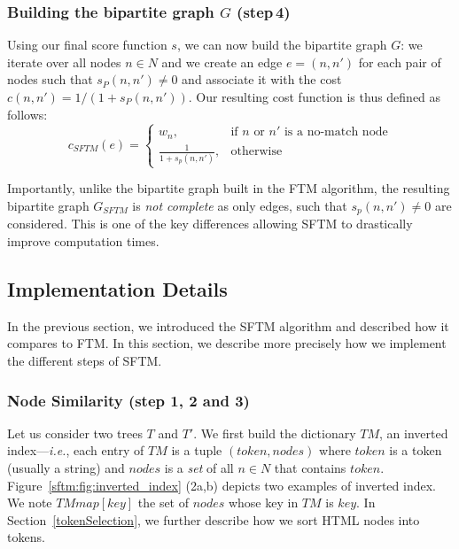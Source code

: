 \subsubsection{Building the bipartite graph $G$ (step\,4)}
Using our final score function $s$, we can now build the bipartite graph $G$: we iterate over all nodes $n \in N$ and we create an edge $e=(n,n')$ for each pair of nodes such that $s_{P}(n,n') \neq 0$ and associate it with the cost $c(n,n') = 1/(1+s_{P}(n,n'))$.
Our resulting cost function is thus defined as follows:
\begin{equation}\label{eq:SFTM_cost}
c_{SFTM}(e) =
\begin{cases}
w_n,                    & \text{if }n\text{ or }n'\text{ is a no-match node}\\
\frac{1}{1+s_{p}(n,n')},& \text{otherwise}
\end{cases}
\end{equation}

Importantly, unlike the bipartite graph built in the FTM algorithm, the resulting bipartite graph $G_{SFTM}$ is \emph{not complete} as only edges, such that $s_{p}(n,n') \neq 0$ are considered.
This is one of the key differences allowing SFTM to drastically improve computation times.

\subsection{Implementation Details}\label{sftm:sec:implementation}
In the previous section, we introduced the SFTM algorithm and described how it compares to FTM.
In this section, we describe more precisely how we implement the different steps of SFTM.  

\subsubsection{Node Similarity (step 1, 2 and 3)}
Let us consider two trees $T$ and $T'$.
We first build the dictionary $TM$, an inverted index---\emph{i.e.}, each entry of $TM$ is a tuple $(token, nodes)$ where $token$ is a token (usually a string) and $nodes$ is a \textit{set} of all $n \in N$ that contains $token$.
Figure~\ref{sftm:fig:inverted_index} (2a,b) depicts two examples of inverted index.
We note $TM{map}[key]$ the set of $nodes$ whose key in $TM$ is $key$.
In Section~\ref{tokenSelection}, we further describe how we sort HTML nodes into tokens.


